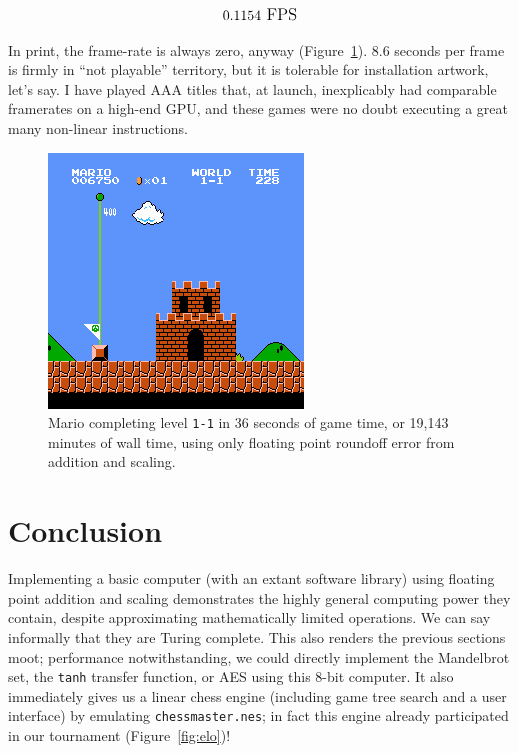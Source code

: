 \documentclass[twocolumn]{article}
\begin{document}
$${\large 0.1154~\textrm{FPS}}$$

In print, the frame-rate is always zero, anyway
(Figure~\ref{fig:mario}). 8.6 seconds per frame is firmly in ``not
playable'' territory, but it is tolerable for installation artwork,
let's say. I have played AAA titles that, at launch, inexplicably had
comparable framerates on a high-end GPU, and these games were no doubt
executing a great many non-linear instructions.

\begin{figure}[htp]
  \begin{center}
    \includegraphics[width=0.9 \linewidth]{mario-1800}
  \end{center}
  \caption{
    Mario completing level {\tt 1-1} in 36 seconds of game time,
    or 19,143 minutes of wall time, using only floating point roundoff
    error from addition and scaling.
  } \label{fig:mario}
\end{figure}

\section{Conclusion}

Implementing a basic computer (with an extant software library) using
floating point addition and scaling demonstrates the highly general
computing power they contain, despite approximating mathematically
limited operations. We can say informally that they are Turing
complete. This also renders the previous sections moot; performance
notwithstanding, we could directly implement the Mandelbrot set, the
{\tt tanh} transfer function, or AES using this 8-bit computer. It
also immediately gives us a linear chess engine (including game tree
search and a user interface) by emulating {\tt chessmaster.nes}; in
fact this engine already participated in our tournament
(Figure~\ref{fig:elo})!
\end{document}
